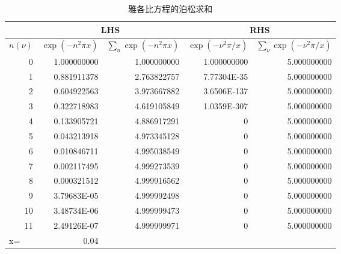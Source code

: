 \begin{table}[htbp]
  \centering
  \caption{雅各比方程的泊松求和}
    \begin{tabular}{|l|r|rrr}
    \toprule
          & \multicolumn{2}{c|}{LHS} & \multicolumn{2}{c|}{RHS} \\
    \midrule
    $n(\nu)$ & \multicolumn{1}{l|}{$\exp \left( -n^{2} \pi x \right)$} & \multicolumn{1}{l|}{$\sum_{n} \exp \left( -n^{2} \pi x \right)$} & \multicolumn{1}{l|}{$\exp \left( -\nu^{2} \pi / x \right)$} &
    \multicolumn{1}{l|}{$\sum_{\nu} \exp \left( -\nu^{2} \pi / x \right)$} \\
    \midrule
    \multicolumn{1}{|r|}{0} & 1.000000000 & \multicolumn{1}{r|}{1.000000000} & \multicolumn{1}{r|}{1.000000000} & \multicolumn{1}{r|}{5.000000000} \\
    \midrule
    \multicolumn{1}{|r|}{1} & 0.881911378 & \multicolumn{1}{r|}{2.763822757} & \multicolumn{1}{r|}{7.77304E-35} & \multicolumn{1}{r|}{5.000000000} \\
    \midrule
    \multicolumn{1}{|r|}{2} & 0.604922563 & \multicolumn{1}{r|}{3.973667882} & \multicolumn{1}{r|}{3.6506E-137} & \multicolumn{1}{r|}{5.000000000} \\
    \midrule
    \multicolumn{1}{|r|}{3} & 0.322718983 & \multicolumn{1}{r|}{4.619105849} & \multicolumn{1}{r|}{1.0359E-307} & \multicolumn{1}{r|}{5.000000000} \\
    \midrule
    \multicolumn{1}{|r|}{4} & 0.133905721 & \multicolumn{1}{r|}{4.886917291} & \multicolumn{1}{r|}{0} & \multicolumn{1}{r|}{5.000000000} \\
    \midrule
    \multicolumn{1}{|r|}{5} & 0.043213918 & \multicolumn{1}{r|}{4.973345128} & \multicolumn{1}{r|}{0} & \multicolumn{1}{r|}{5.000000000} \\
    \midrule
    \multicolumn{1}{|r|}{6} & 0.010846711 & \multicolumn{1}{r|}{4.995038549} & \multicolumn{1}{r|}{0} & \multicolumn{1}{r|}{5.000000000} \\
    \midrule
    \multicolumn{1}{|r|}{7} & 0.002117495 & \multicolumn{1}{r|}{4.999273539} & \multicolumn{1}{r|}{0} & \multicolumn{1}{r|}{5.000000000} \\
    \midrule
    \multicolumn{1}{|r|}{8} & 0.000321512 & \multicolumn{1}{r|}{4.999916562} & \multicolumn{1}{r|}{0} & \multicolumn{1}{r|}{5.000000000} \\
    \midrule
    \multicolumn{1}{|r|}{9} & 3.79683E-05 & \multicolumn{1}{r|}{4.999992498} & \multicolumn{1}{r|}{0} & \multicolumn{1}{r|}{5.000000000} \\
    \midrule
    \multicolumn{1}{|r|}{10} & 3.48734E-06 & \multicolumn{1}{r|}{4.999999473} & \multicolumn{1}{r|}{0} & \multicolumn{1}{r|}{5.000000000} \\
    \midrule
    \multicolumn{1}{|r|}{11} & 2.49126E-07 & \multicolumn{1}{r|}{4.999999971} & \multicolumn{1}{r|}{0} & \multicolumn{1}{r|}{5.000000000} \\
    \midrule
    x=    & 0.04  &       &       &  \\
\cmidrule{1-2}    \end{tabular}%
  \label{tab:fourier-poisson-jacobian-equiv}%


\end{table}
